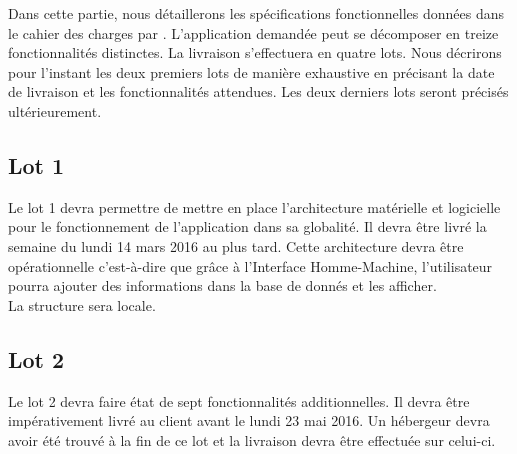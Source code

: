 \label{spec_fonct}
Dans cette partie, nous détaillerons les spécifications fonctionnelles données dans le cahier des charges par \nomClient. 
L'application demandée peut se décomposer en treize fonctionnalités distinctes. La livraison s'effectuera en quatre lots. Nous décrirons pour l'instant les deux premiers lots de manière exhaustive en précisant la date de livraison et les fonctionnalités attendues. Les deux derniers lots seront précisés ultérieurement.

\subsection{Lot 1}

Le lot 1 devra permettre de mettre en place l'architecture matérielle et logicielle pour le fonctionnement de l'application dans sa globalité.
Il devra être livré la semaine du lundi 14 mars 2016 au plus tard. Cette architecture devra être opérationnelle c'est-à-dire que grâce à l'Interface Homme-Machine, l'utilisateur pourra ajouter des informations dans la base de donnés et les afficher.\\
La structure sera locale.\\


\subsection{Lot 2}
Le lot 2 devra faire état de sept fonctionnalités additionnelles. Il devra être impérativement livré au client avant le lundi 23 mai 2016. Un hébergeur devra avoir été trouvé à la fin de ce lot et la livraison devra être effectuée sur celui-ci.

